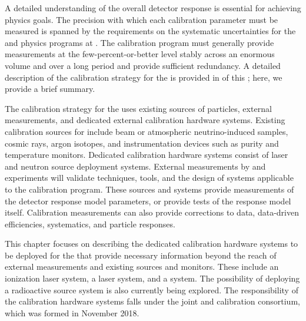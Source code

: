 


A detailed understanding of the overall detector response is essential for achieving  physics goals. The precision with which each calibration parameter must be measured is spanned by the requirements on the %
systematic uncertainties for the  %
and  physics programs at . The calibration program must generally provide measurements at the few-percent-or-better 
level stably across an enormous volume and over a long period and provide sufficient redundancy. A detailed description of the calibration strategy for the   is provided in \physchtools of this ; here, we provide a brief summary.

The %
calibration strategy for the   uses existing sources of particles, external measurements, and dedicated external calibration hardware systems. Existing calibration sources for  include beam or atmospheric neutrino-induced samples, cosmic rays, argon isotopes, and instrumentation devices such as  purity and temperature monitors. Dedicated calibration hardware systems consist of laser  and neutron source deployment systems.  External measurements by  and  experiments  will validate techniques, tools, and the design of systems applicable to the  calibration program. These sources and systems provide measurements of the detector response model parameters, or provide tests of the response model itself. Calibration measurements can also provide corrections to data, data-driven efficiencies, systematics, and particle responses.


This chapter focuses on describing the dedicated calibration hardware systems to be deployed for the   that provide necessary information beyond the reach of external measurements and existing sources and monitors. These include an ionization laser system, a \phel laser system, and a  system. The possibility of deploying a radioactive source system is also currently being explored. The responsibility of the calibration hardware systems falls under the joint  and  calibration consortium, which was formed in November 2018.

